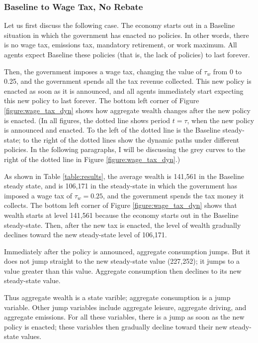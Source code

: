 \documentclass[letter, 12pt, epsf,leqno]{article}
\begin{document}
\subsubsection{Baseline to Wage Tax, No Rebate}

Let us first discuss the following case.  The economy starts out in a Baseline situation in which the government has enacted no policies.  In other words, there is no wage tax, emissions tax, mandatory retirement, or work maximum.  All agents expect Baseline these policies (that is, the lack of policies) to last forever.\par

Then, the government imposes a wage tax, changing the value of $\tau_w$ from 0 to 0.25, and the government spends all the tax revenue collected.  This new policy is enacted as soon as it is announced, and all agents immediately start expecting this new policy to last forever.  The bottom left corner of Figure \ref{figure:wage_tax_dyn} shows how aggregate wealth changes after the new policy is enacted.  (In all figures, the dotted line shows period $t=\tau$, when the new policy is announced and enacted.  To the left of the dotted line is the Baseline steady-state; to the right of the dotted lines show the dynamic paths under different policies.  In the following paragraphs, I will be discussing the grey curves to the right of the dotted line in Figure \ref{figure:wage_tax_dyn}.)  \par




As shown in Table \ref{table:results}, the average wealth is 141,561 in the Baseline steady state, and is 106,171 in the steady-state in which the government has imposed a wage tax of $\tau_w=0.25$, and the government spends the tax money it collects.  The bottom left corner of Figure \ref{figure:wage_tax_dyn} shows that wealth starts at level 141,561 because the economy starts out in the Baseline steady-state.  Then, after the new tax is enacted, the level of wealth gradually declines toward the new steady-state level of 106,171.\par

Immediately after the policy is announced, aggregate consumption jumps.  But it does not jump straight to the new steady-state value (227,252); it jumps to a value greater than this value.  Aggregate consumption then declines to its new steady-state value. \par 

Thus aggregate wealth is a state varible; aggregate consumption is a jump variable.  Other jump variables include aggregate leisure, aggregate driving, and aggregate emissions.  For all these variables, there is a jump as soon as the new policy is enacted; these variables then gradually decline toward their new steady-state values.\par
\end{document}
